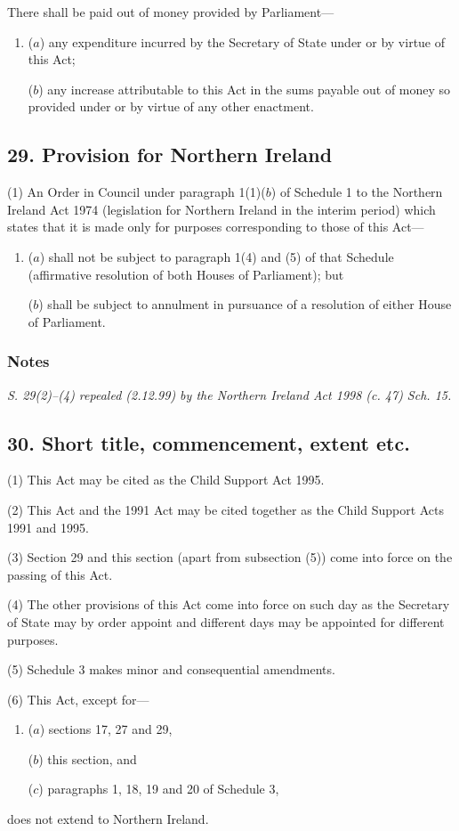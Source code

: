 \documentclass[a4paper]{article}
\newcommand\amendment[1]{\subsubsection*{Notes}{\itshape\frenchspacing\footnotesize #1 \par}}
\begin{document}
There shall be paid out of money provided by Parliament—
\begin{enumerate}\item[]
($a$) any expenditure incurred by the Secretary of State under or by virtue of this Act;

($b$) any increase attributable to this Act in the sums payable out of money so provided under or by virtue of any other enactment.
\end{enumerate}

\subsection{29. Provision for Northern Ireland}

(1) An Order in Council under paragraph 1(1)($b$) of Schedule 1 to the Northern Ireland Act 1974 (legislation for Northern Ireland in the interim period) which states that it is made only for purposes corresponding to those of this Act—
\begin{enumerate}\item[]
($a$) shall not be subject to paragraph 1(4) and (5) of that Schedule (affirmative resolution of both Houses of Parliament); but

($b$) shall be subject to annulment in pursuance of a resolution of either House of Parliament.
\end{enumerate}

\amendment{
S. 29(2)--(4) repealed (2.12.99) by the Northern Ireland Act 1998 (c. 47) Sch. 15.
}

\subsection{30. Short title, commencement, extent etc.}

(1) This Act may be cited as the Child Support Act 1995.

(2) This Act and the 1991 Act may be cited together as the Child Support Acts 1991 and 1995.

(3) Section 29 and this section (apart from subsection (5)) come into force on the passing of this Act.

(4) The other provisions of this Act come into force on such day as the Secretary of State may by order appoint and different days may be appointed for different purposes.

(5) Schedule 3 makes minor and consequential amendments.

(6) This Act, except for—
\begin{enumerate}\item[]
($a$) sections 17, 27 and 29,

($b$) this section, and

($c$) paragraphs 1, 18, 19 and 20 of Schedule 3,
\end{enumerate}
does not extend to Northern Ireland.
\end{document}
